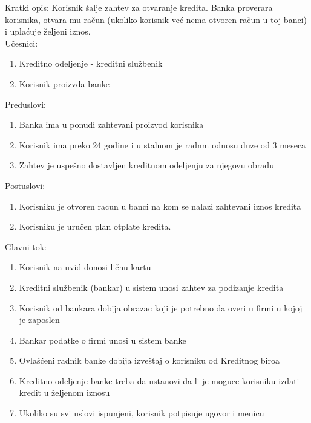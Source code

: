 \documentclass{article}
\begin{document}
Kratki opis: Korisnik šalje zahtev za otvaranje kredita. Banka proverara korisnika, otvara mu račun (ukoliko korisnik već nema otvoren račun u toj banci) i uplaćuje željeni iznos.\\
Učesnici: 
\begin{enumerate}
\item Kreditno odeljenje - kreditni službenik
\item Korisnik proizvda banke
\end{enumerate}
Preduslovi: 
\begin{enumerate}
\item Banka ima u ponudi zahtevani proizvod korisnika
\item Korisnik ima preko 24 godine i u stalnom je radnm odnosu duze od 3 meseca 
\item Zahtev je uspešno dostavljen kreditnom odeljenju za njegovu obradu 
\end{enumerate}
Postuslovi: 
\begin{enumerate}
\item Korisniku je otvoren racun u banci na kom se nalazi zahtevani iznos kredita 
\item Korisniku je uručen plan otplate kredita. 
\end{enumerate}
Glavni tok: 
\begin{enumerate}
\item Korisnik na uvid donosi ličnu kartu 
\item Kreditni službenik (bankar) u sistem unosi zahtev za podizanje kredita 
\item Korisnik od bankara dobija obrazac koji je potrebno da overi u firmi u kojoj je zaposlen 
\item Bankar podatke o firmi unosi u sistem banke 
\item Ovlašćeni radnik banke dobija izveštaj o korisniku od Kreditnog biroa 
\item Kreditno odeljenje banke treba da ustanovi da li je moguce korisniku izdati kredit u željenom iznosu 
\item Ukoliko su svi uslovi ispunjeni, korisnik potpisuje ugovor i menicu 
\end{enumerate}
\end{document}
